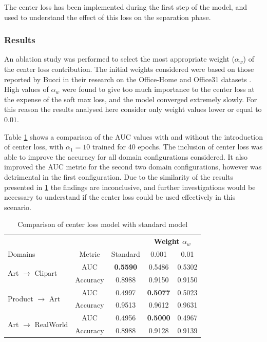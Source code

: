 \documentclass[10pt,twocolumn,letterpaper]{article}
\begin{document}
The center loss has been implemented during the first step of the model, and used to understand the effect of this loss on the separation phase.

\subsubsection*{Results}

An ablation study was performed to select the most appropriate weight ($\alpha_w$) of the center loss contribution. The initial weights considered were based on those reported by Bucci \etal \cite{Bucci2020} in their research on the Office-Home \cite{OfficeHome} and Office31 datasets \cite{Office31}. High values of $\alpha_w$ were found to give too much importance to the center loss at the expense of the soft max loss, and the model converged extremely slowly. For this reason the results analysed here consider only weight values lower or equal to $0.01$.

Table \ref{tab:center_loss} shows a comparison of the AUC values with and without the introduction of center loss, with $\alpha_1 = 10$ trained for 40 epochs. The inclusion of center loss was able to improve the accuracy for all domain configurations considered. It also improved the AUC metric for the second two domain configurations, however was detrimental in the first configuration. Due to the similarity of the results presented in \ref{tab:center_loss} the findings are inconclusive, and further investigations would be necessary to understand if the center loss could be used effectively in this scenario.

\begin{table}
	\centering
	\small
	\begin{tabular}{|l|c|c|c|c|}
		\hline
		 & & & \multicolumn{2}{c|}{\textbf{Weight  $\alpha_w$}} \\
		Domains & Metric & Standard & 0.001 & 0.01\\
		\hline
		\multirow{2}{*}{Art $\to$ Clipart}
		& AUC & \textbf{0.5590} & 0.5486 & 0.5302\\ 
		& Accuracy & 0.8988 & 0.9150 & 0.9150\\
		\hline
		\multirow{2}{*}{Product $\to$ Art}
		& AUC & 0.4997 & \textbf{0.5077} & 0.5023\\ 
		& Accuracy & 0.9513 & 0.9612 & 0.9631\\
		\hline
		\multirow{2}{*}{Art $\to$ RealWorld}
		& AUC & 0.4956 & \textbf{0.5000} & 0.4967\\ 
		& Accuracy & 0.8988 & 0.9128 & 0.9139\\
		\hline
	\end{tabular}
	\caption{Comparison of center loss model with standard model}
	\label{tab:center_loss}
\end{table}
\end{document}

